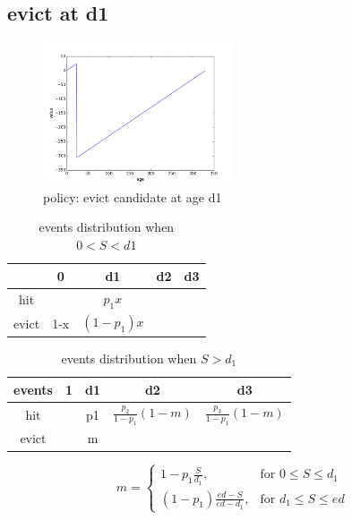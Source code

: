 \documentclass[12pt, letterpaper]{article}
\begin{document}
\subsection{evict at d1}

\begin{figure}[H]
\centering
\includegraphics[width=0.5\textwidth]{evict_d1}
\caption{policy: evict candidate at age d1}
\end{figure}

\begin{table}[H]
\begin{center}
\begin{tabular}{c|c c c c}
\hline
 & 0 & d1 & d2 & d3 \\
 \hline
hit & & $p_1 x$ & \\
evict & 1-x & $(1-p_1) x$ & \\
\end{tabular}
\caption{events distribution when $0<S<d1$}
\end{center}
\end{table}

\begin{table}[H]
\begin{center}
\begin{tabular}{c | c c c c}
\hline
events & 1 & d1 & d2 & d3 \\
\hline
hit & & p1 & $\frac{p_2}{1-p_1} (1-m) $ & $\frac{p_3}{1-p_1} (1-m)$ \\
evict & & m & & \\
\hline
\end{tabular}
\caption{events distribution when $S>d_1$}
\end{center}
\end{table}

\[
m = \left\{\begin{array}{lr}
      1-p_1 \frac{S}{d_1}, & \text{for } 0 \leq S \leq d_1 \\
      (1-p_1) \frac{ed-S}{ed-d_1}, & \text{for } d_1 \leq S \leq ed
           \end{array}
           \right.
\]
\end{document}
